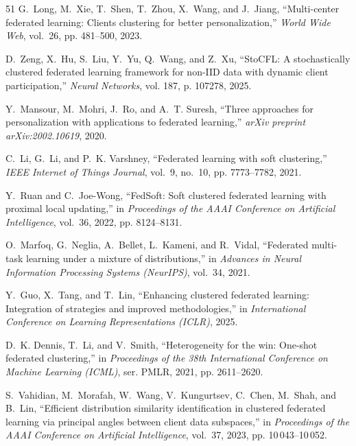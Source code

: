 \documentclass[journal]{IEEEtran}
\theoremstyle{definition}
\begin{document}
\begin{thebibliography}{51}
G.~Long, M.~Xie, T.~Shen, T.~Zhou, X.~Wang, and J.~Jiang, ``Multi-center
  federated learning: Clients clustering for better personalization,''
  \emph{World Wide Web}, vol.~26, pp. 481--500, 2023.

D.~Zeng, X.~Hu, S.~Liu, Y.~Yu, Q.~Wang, and Z.~Xu, ``{StoCFL}: A stochastically
  clustered federated learning framework for non-{IID} data with dynamic client
  participation,'' \emph{Neural Networks}, vol. 187, p. 107278, 2025.

Y.~Mansour, M.~Mohri, J.~Ro, and A.~T. Suresh, ``Three approaches for
  personalization with applications to federated learning,'' \emph{arXiv
  preprint arXiv:2002.10619}, 2020.

C.~Li, G.~Li, and P.~K. Varshney, ``Federated learning with soft clustering,''
  \emph{IEEE Internet of Things Journal}, vol.~9, no.~10, pp. 7773--7782, 2021.

Y.~Ruan and C.~Joe-Wong, ``{FedSoft}: Soft clustered federated learning with
  proximal local updating,'' in \emph{Proceedings of the AAAI Conference on
  Artificial Intelligence}, vol.~36, 2022, pp. 8124--8131.

O.~Marfoq, G.~Neglia, A.~Bellet, L.~Kameni, and R.~Vidal, ``Federated
  multi-task learning under a mixture of distributions,'' in \emph{Advances in
  Neural Information Processing Systems (NeurIPS)}, vol.~34, 2021.

Y.~Guo, X.~Tang, and T.~Lin, ``Enhancing clustered federated learning:
  Integration of strategies and improved methodologies,'' in
  \emph{International Conference on Learning Representations (ICLR)}, 2025.

D.~K. Dennis, T.~Li, and V.~Smith, ``Heterogeneity for the win: One-shot
  federated clustering,'' in \emph{Proceedings of the 38th International
  Conference on Machine Learning (ICML)}, ser. PMLR, 2021, pp. 2611--2620.

S.~Vahidian, M.~Morafah, W.~Wang, V.~Kungurtsev, C.~Chen, M.~Shah, and B.~Lin,
  ``Efficient distribution similarity identification in clustered federated
  learning via principal angles between client data subspaces,'' in
  \emph{Proceedings of the AAAI Conference on Artificial Intelligence},
  vol.~37, 2023, pp. 10\,043--10\,052.


\end{thebibliography}
\end{document}
